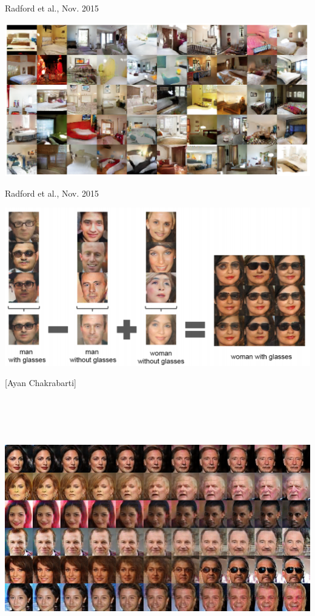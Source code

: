 {
{Radford et al., Nov. 2015}

\centerline{\includegraphics[width = 9in]{../images/GANDCa}}

{Radford et al., Nov. 2015}

\centerline{\includegraphics[width = 9in]{../images/ImageFeatures}}


[Ayan Chakrabarti]

\centerline{\includegraphics[height = 4.5in]{../images/interp}}

}
